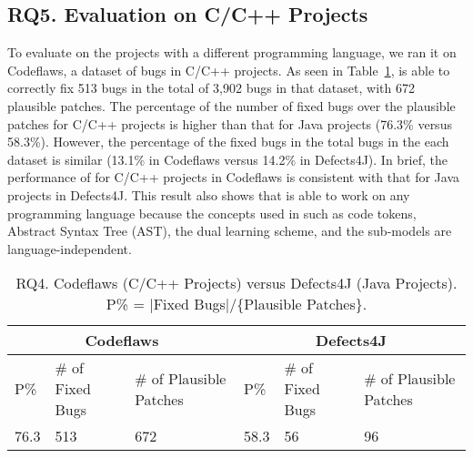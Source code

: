 \subsection{\bf RQ5. Evaluation on C/C++ Projects}
\label{sec:eval-c}

To evaluate {\tool} on the projects with a different programming
language, we ran it on Codeflaws, a dataset of bugs in C/C++ projects.
As seen in Table~\ref{RQ5}, {\tool} is able to correctly fix 513 bugs
in the total of 3,902 bugs in that dataset, with 672 plausible
patches. The percentage of the number of fixed bugs over the plausible
patches for C/C++ projects is higher than that for Java projects
(76.3\% versus 58.3\%). However, the percentage of the fixed bugs in
the total bugs in the each dataset is similar (13.1\% in
Codeflaws versus 14.2\% in Defects4J). In brief, the performance of
{\tool} for C/C++ projects in Codeflaws is consistent with that for
Java projects in Defects4J. This result also shows that {\tool} is
able to work on any programming language because the concepts used in
{\tool} such as code tokens, Abstract Syntax Tree (AST), the dual
learning scheme, and the sub-models are language-independent.





\begin{table}[t]
	\caption{RQ4. Codeflaws (C/C++ Projects) versus Defects4J (Java Projects). P\% = $|$Fixed Bugs$|$/\{Plausible Patches\}.}
	\vspace{-5pt}
	{\small
		\begin{center}
			\tabcolsep 2.7pt
			\begin{tabular}{p{0.5cm}<{\centering}|p{1.5cm}<{\centering}|p{1.55cm}<{\centering}|p{0.5cm}<{\centering}|p{1.5cm}<{\centering}|p{1.55cm}<{\centering}}\hline	
				
				\multicolumn{3}{c|}{Codeflaws } & \multicolumn{3}{c}{Defects4J}\\\hline
				 P\%& \# of Fixed Bugs& \# of Plausible Patches &P\%& \# of Fixed Bugs & \# of Plausible Patches \\ \hline
				
				  76.3  &        513       &            672             &  58.3 &          56        &        96                 \\
				\hline

			\end{tabular}
			\label{RQ5}
		\end{center}
	}
\end{table}
